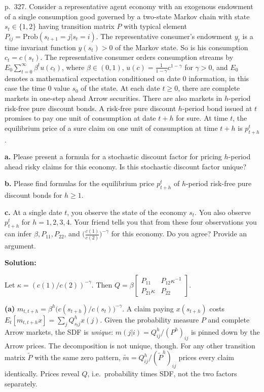 \documentclass[12pt, letterpaper]{article}
\begin{document}
\begin{tcolorbox}[evenbox,title={Exercise 8.26 \quad Recovering probabilities from prices, III}]
\begin{tcolorbox}[questionbox]
p.~327. Consider a representative agent economy with an exogenous endowment of a single consumption good
governed by a two-state Markov chain with state $s_t\in\{1,2\}$ having transition matrix $P$ with typical
element $P_{ij}=\mathrm{Prob}(s_{t+1}=j|s_t=i)$. The representative consumer's endowment $y_t$ is a time invariant
function $y(s_t)>0$ of the Markov state. So is his consumption $c_t=c(s_t)$. The representative consumer
orders consumption streams by $E_0\sum_{t=0}^\infty\beta^tu(c_t)$, where $\beta\in(0,1)$, $u(c)=\frac1{1-\gamma}c^{1-\gamma}$
for $\gamma>0$, and $E_0$ denotes a mathematical expectation conditioned on date 0 information, in this case the
time 0 value $s_0$ of the state. At each date $t\ge0$, there are complete markets in one-step ahead Arrow
securities. There are also markets in $h$-period risk-free pure discount bonds. A risk-free pure discount
$h$-period bond issued at $t$ promises to pay one unit of consumption at date $t+h$ for sure. At time $t$, the
equilibrium price of a sure claim on one unit of consumption at time $t+h$ is $p^t_{t+h}$.

\textbf{a.} Please present a formula for a stochastic discount factor for pricing $h$-period ahead risky claims
for this economy. Is this stochastic discount factor unique?

\textbf{b.} Please find formulas for the equilibrium price $p^t_{t+h}$ of $h$-period risk-free pure discount bonds
for $h\ge1$.

\textbf{c.} At a single date $t$, you observe the state of the economy $s_t$. You also observe $p^t_{t+h}$ for
$h=1,2,3,4$. Your friend tells you that from these four observations you can infer $\beta,P_{11},P_{22}$, and
$\big(\frac{c(1)}{c(2)}\big)^{-\gamma}$ for this economy. Do you agree? Provide an argument.
\end{tcolorbox}

\textbf{Solution:}

Let $\kappa=(c(1)/c(2))^{-\gamma}$. Then $Q=\beta\begin{bmatrix}P_{11}&P_{12}\kappa^{-1}\\P_{21}\kappa&P_{22}\end{bmatrix}$.

\textbf{(a)} $m_{t,t+h}=\beta^h\big(c(s_{t+h})/c(s_t)\big)^{-\gamma}$. A claim paying $x(s_{t+h})$ costs
$E_t[m_{t,t+h}x]=\sum_jQ^h_{s_tj}x(j)$. Given the probability measure $P$ and complete Arrow markets, the SDF is
\emph{unique}: $m(j|i)=Q^h_{ij}/(P^h)_{ij}$ is pinned down by the Arrow prices. The decomposition is not unique,
though. For any other transition matrix $\tilde P$ with the same zero pattern, $\tilde m=Q^h_{ij}/(\tilde P^h)_{ij}$ prices every
claim identically. Prices reveal $Q$, i.e.\ probability times SDF, not the two factors separately.


\end{tcolorbox}
\end{document}
